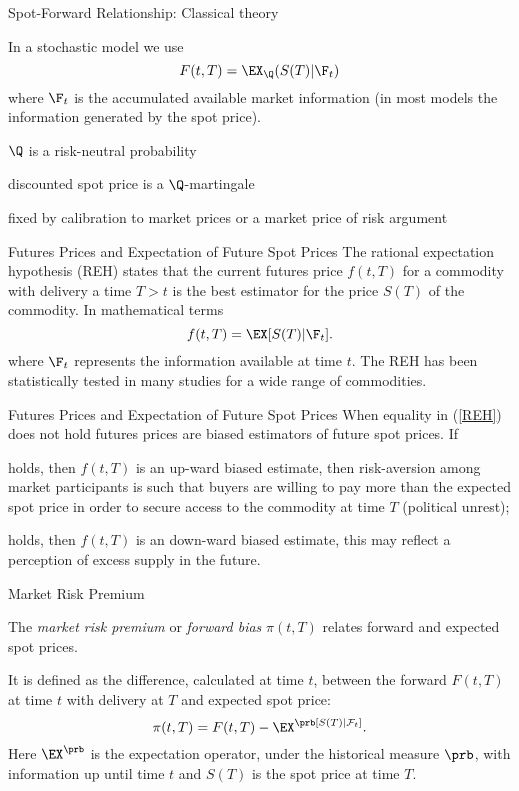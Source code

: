 {%
{Spot-Forward Relationship: Classical theory}
\item<1-> In a stochastic model we use
$$
F(t,T)=\EX_{\Q}(S(T)|\F_t)
$$
where $\F_t$ is the accumulated available market information (in most models the information generated by the spot price).
\item<2-> $\Q$ is a risk-neutral probability
\item discounted spot price is a $\Q$-martingale
\item fixed by calibration to market prices or a market price of risk argument

{Futures Prices and Expectation of Future Spot Prices}
The rational expectation hypothesis (REH) states that the current futures price $f(t,T)$ for a commodity with
delivery a time $T>t$ is the best estimator for the price $S(T)$ of the commodity.
In mathematical terms
\begin{equation}\label{REH}
f(t,T) = \EX[S(T) |\F_t].
\end{equation}
where $\F_t$ represents the information available at time $t$. The REH has been statistically
tested in many studies for a wide range of commodities.

{Futures Prices and Expectation of Future Spot Prices}
When equality in (\ref{REH}) does not hold futures prices are biased estimators of
future spot prices. If
\item[$>$] holds, then $f(t,T)$ is an up-ward biased estimate, then risk-aversion
among market participants is such that buyers are willing to pay more than the expected
spot price in order to secure access to the commodity at time $T$ (political unrest);
\item[$<$] holds, then $f(t,T)$ is an down-ward biased estimate, this may reflect a
perception of excess supply in the future.

{Market Risk Premium}
\item<1-> The \emph{market risk premium} or \emph{forward bias} $\pi (t,T)$
relates forward and expected spot prices.
\item<2-> It is defined as the difference, calculated at time $t$, between
the forward $F(t,T)$ at time $t$ with delivery at $T$ and expected
spot price:
\begin{equation}\label{forward risk premium}
\pi(t,T)= F(t,T)-\EX^\prb[S(T)|\mathcal F_t].
\end{equation}
Here $\EX^\prb$ is the expectation operator, under the
historical measure $\prb$, with information up until time $t$ and
$S(T)$ is the spot price at time $T$.

}
